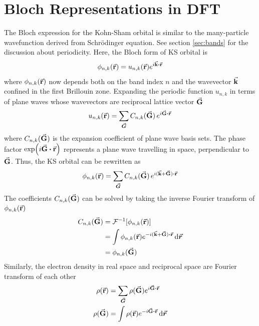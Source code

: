 \section{Bloch Representations in DFT}
The Bloch expression for the Kohn-Sham orbital is similar to the many-particle wavefunction derived from Schr\"{o}dinger equation. See section \ref{sec:bands} for the discussion about periodicity. Here, the Bloch form of KS orbital is 
\begin{equation}
    \phi_{n,k}(\va{r}) = u_{n,k} (\va{r}) e^{i \va{k} \vdot \va{r}}
\end{equation}
where $\phi_{n,k}(\va{r})$ now depends both on the band index $n$ and the wavevector $\va{k}$ confined in the first Brillouin zone. Expanding the periodic function $u_{n,k}$ in terms of plane waves whose wavevectors are reciprocal lattice vector $\va{G}$
\begin{equation}
    u_{n,k} (\va{r}) =  \sum_{\va*{G}} C_{n,k}(\va{G})\, e^{i \va{G} \vdot \va{r}}
\end{equation}
where $C_{n,k}(\va{G})$ is the expansion coefficient of plane wave basis sets. The phase factor $\exp({i \va{G} \vdot \va{r}}) $ represents a plane wave travelling in space, perpendicular to $\va{G}$. Thus, the KS orbital can be rewritten as 
\begin{equation} \label{eq:orbital_rec}
    \phi_{n,k}(\va{r})  = \sum_{\va*{G}} C_{n,k}(\va{G})\, e^{i (\va{k} + \va{G} ) \vdot \va{r}}
\end{equation}
The coefficients $C_{n,k}(\va{G})$ can be solved by taking the inverse Fourier transform of $\phi_{n,k}(\va{r}) $
\begin{align}
    C_{n,k}(\va{G}) &= \mathcal{F}^{-1} [\phi_{n,k}(\va{r})] \\
            &= \int \phi_{n,k}(\va{r}) e^{- i (\va{k} + \va{G} ) \vdot \va{r}} \dd{\va*{r}} \\
            &= \phi_{n,k}(\va{G})
\end{align}
Similarly, the electron density in real space and reciprocal space are Fourier transform of each other
\begin{align}
    \rho({\va{r}}) &= \sum_{\va*{G}} \rho({\va{G}}) e^{i \va{G} \vdot \va{r}} \label{eq:density_rec}  \\
    \rho({\va{G}})  &= \int \rho({\va{r}}) e^{-i \va{G} \vdot \va{r}} \dd{\va*{r}}
\end{align}


